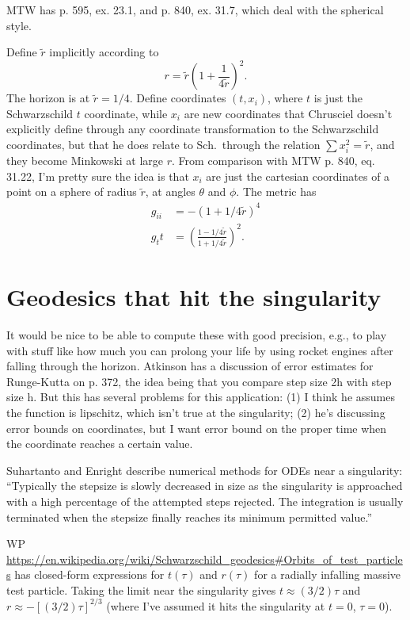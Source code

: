 \documentclass{article}
\begin{document}
MTW has p. 595, ex. 23.1, and p. 840, ex. 31.7, which deal with the spherical style.

Define $\tilde{r}$ implicitly according to
\begin{equation}
  r = \tilde{r}\left(1+\frac{1}{4\tilde{r}}\right)^2.
\end{equation}
The horizon is at $\tilde{r}=1/4$. Define coordinates $(t,x_i)$, where $t$ is
just the Schwarzschild $t$ coordinate, while $x_i$ are new coordinates that Chrusciel doesn't
explicitly define through any coordinate transformation to the Schwarzschild coordinates,
but that he does relate to Sch.~through the relation $\sum x_i^2=\tilde{r}$, and they
become Minkowski at large $r$. From comparison with MTW p. 840, eq. 31.22, I'm pretty
sure the idea is that $x_i$ are just the cartesian coordinates of a point on a sphere
of radius $\tilde{r}$, at angles $\theta$ and $\phi$. The metric has
\begin{align}
  g_{ii} &= -(1+1/4\tilde{r})^4 \\
  g_tt &= \left(\frac{1-1/4\tilde{r}}{1+1/4\tilde{r}}\right)^2.
\end{align}

\section{Geodesics that hit the singularity}

It would be nice to be able to compute these with good precision, e.g., to play with
stuff like how much you can prolong your life by using rocket engines after falling
through the horizon. Atkinson has a discussion of error estimates for Runge-Kutta on
p. 372, the idea being that you compare step size 2h with step size h. But this has
several problems for this application: (1) I think he assumes the function is lipschitz,
which isn't true at the singularity; (2) he's discussing error bounds on coordinates,
but I want error bound on the proper time when the coordinate reaches a certain value.

Suhartanto and Enright describe numerical methods for ODEs near a singularity:
``Typically
the stepsize is slowly decreased in size as the singularity is
approached with a high percentage of the attempted steps rejected.
The integration is usually terminated when the stepsize finally
reaches its minimum permitted value.''

WP
\url{https://en.wikipedia.org/wiki/Schwarzschild_geodesics#Orbits_of_test_particles}
has closed-form expressions for $t(\tau)$ and $r(\tau)$ for a radially infalling
massive test particle. Taking the limit near the singularity gives
$t\approx(3/2)\tau$ and $r\approx -[(3/2)\tau]^{2/3}$ (where I've assumed it hits
the singularity at $t=0$, $\tau=0$).
\end{document}
